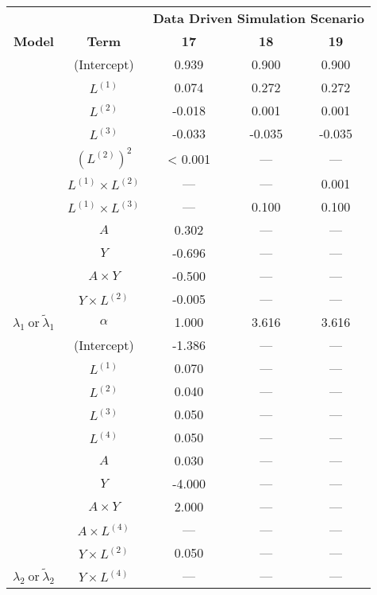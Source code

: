 \begin{table}
\begin{minipage}[t]{0.5\textwidth}
\begin{tabular}[t]{|>{}c|c|c|c|>{}c|}
\hline
\multicolumn{1}{|c|}{\textbf{ }} & \multicolumn{1}{|c|}{\textbf{ }} & \multicolumn{3}{|c|}{\textbf{Data Driven Simulation Scenario}} \\
\cline{3-5}
\textbf{Model} & \textbf{Term} & \textbf{17} & \textbf{18} & \textbf{19}\\
\hline
 & (Intercept) & 0.939 & 0.900 & 0.900\\
\cline{2-5}
 & $L^{(1)}$ & 0.074 & 0.272 & 0.272\\
\cline{2-5}
 & $L^{(2)}$ & -0.018 & 0.001 & 0.001\\
\cline{2-5}
 & $L^{(3)}$ & -0.033 & -0.035 & -0.035\\
\cline{2-5}
 & $(L^{(2)})^2$ & < 0.001 & --- & ---\\
\cline{2-5}
 & $L^{(1)} \times L^{(2)}$ & --- & --- & 0.001\\
\cline{2-5}
 & $L^{(1)} \times L^{(3)}$ & --- & 0.100 & 0.100\\
\cline{2-5}
 & $A$ & 0.302 & --- & ---\\
\cline{2-5}
 & $Y$ & -0.696 & --- & ---\\
\cline{2-5}
 & $A\times Y$ & -0.500 & --- & ---\\
\cline{2-5}
 & $Y \times L^{(2)}$ & -0.005 & --- & ---\\
\cline{2-5}
\multirow{-12}{*}{\centering\arraybackslash $\lambda_1~\text{or}~\tilde\lambda_1$} & $\alpha$ & 1.000 & 3.616 & 3.616\\
\cline{1-5}
 & (Intercept) & -1.386 & --- & ---\\
\cline{2-5}
 & $L^{(1)}$ & 0.070 & --- & ---\\
\cline{2-5}
 & $L^{(2)}$ & 0.040 & --- & ---\\
\cline{2-5}
 & $L^{(3)}$ & 0.050 & --- & ---\\
\cline{2-5}
 & $L^{(4)}$ & 0.050 & --- & ---\\
\cline{2-5}
 & $A$ & 0.030 & --- & ---\\
\cline{2-5}
 & $Y$ & -4.000 & --- & ---\\
\cline{2-5}
 & $A\times Y$ & 2.000 & --- & ---\\
\cline{2-5}
 & $A \times L^{(4)}$ & --- & --- & ---\\
\cline{2-5}
 & $Y \times L^{(2)}$ & 0.050 & --- & ---\\
\cline{2-5}
\multirow{-11}{*}{\centering\arraybackslash $\lambda_2~\text{or}~\tilde\lambda_2$} & $Y \times L^{(4)}$ & --- & --- & ---\\
\hline
\end{tabular}
\end{minipage}
\end{table}
